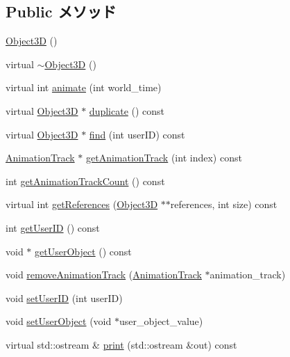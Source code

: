 \subsection*{Public メソッド}
\begin{CompactItemize}
\item 
\hyperlink{classm3g_1_1Object3D_f4b10c33b9014a3f0a675ef4b699b773}{Object3D} ()
\item 
virtual \hyperlink{classm3g_1_1Object3D_8ece10725587e63a2c75283c16cc4df5}{$\sim$Object3D} ()
\item 
virtual int \hyperlink{classm3g_1_1Object3D_8aad1ceab4c2a03609c8a42324ce484d}{animate} (int world\_\-time)
\item 
virtual \hyperlink{classm3g_1_1Object3D}{Object3D} $\ast$ \hyperlink{classm3g_1_1Object3D_a25110dac934f867b83b73ad4741a0f4}{duplicate} () const 
\item 
virtual \hyperlink{classm3g_1_1Object3D}{Object3D} $\ast$ \hyperlink{classm3g_1_1Object3D_aa62f6aaac2e9359875f027ca05788ac}{find} (int userID) const 
\item 
\hyperlink{classm3g_1_1AnimationTrack}{AnimationTrack} $\ast$ \hyperlink{classm3g_1_1Object3D_f0978f3f2efe3227ca613da3361424dd}{getAnimationTrack} (int index) const 
\item 
int \hyperlink{classm3g_1_1Object3D_0926843b66090795972850376b8e4e6c}{getAnimationTrackCount} () const 
\item 
virtual int \hyperlink{classm3g_1_1Object3D_ddf91fbaaa866aa7aad5d530a69feba8}{getReferences} (\hyperlink{classm3g_1_1Object3D}{Object3D} $\ast$$\ast$references, int size) const 
\item 
int \hyperlink{classm3g_1_1Object3D_b8d9067364251d0208fcdc502d394e2c}{getUserID} () const 
\item 
void $\ast$ \hyperlink{classm3g_1_1Object3D_a9b8541216c1fa7792617218a5fb6672}{getUserObject} () const 
\item 
void \hyperlink{classm3g_1_1Object3D_e36d8f8544daee6bd4e2ccd6755ed03d}{removeAnimationTrack} (\hyperlink{classm3g_1_1AnimationTrack}{AnimationTrack} $\ast$animation\_\-track)
\item 
void \hyperlink{classm3g_1_1Object3D_5e4753e91dca5aa56abacb7fde69f332}{setUserID} (int userID)
\item 
void \hyperlink{classm3g_1_1Object3D_052563fbd888204955f1a56628882f14}{setUserObject} (void $\ast$user\_\-object\_\-value)
\item 
virtual std::ostream \& \hyperlink{classm3g_1_1Object3D_6fea17fa1532df3794f8cb39cb4f911f}{print} (std::ostream \&out) const 
\end{CompactItemize}
